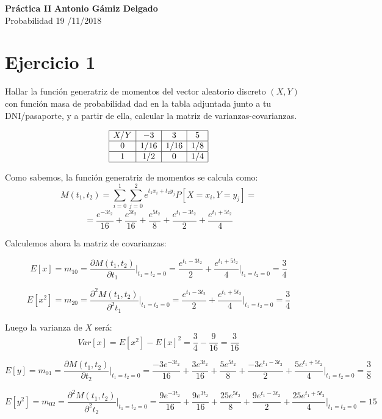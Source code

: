 \documentclass[a4paper, 11pt]{article}
\begin{document}
\noindent
\large\textbf{Práctica II} \hfill \textbf{Antonio Gámiz Delgado} \\
\normalsize Probabilidad \hfill 19 /11/2018

\section*{Ejercicio 1}

Hallar la función generatriz de momentos del vector aleatorio discreto $(X,Y)$ con función masa de probabilidad dad en la tabla adjuntada junto a tu DNI/pasaporte, y a partir de ella, calcular la matriz de varianzas-covarianzas.   

\[
\begin{array}{|c|c|c|c|}
\hline
X/Y & -3 & 3 & 5 \\
\hline
0&1/16&1/16&1/8\\
\hline
1&1/2&0&1/4 \\
\hline
\end{array}
\]

Como sabemos, la función generatriz de momentos se calcula como:
\[
M(t_1,t_2) = \sum_{i=0}^1\sum_{j=0}^2e^{t_1x_i+t_2y_j}P[X=x_i, Y=y_j] = 
\]
\[
= \frac{e^{-3t_2}}{16} + \frac{e^{3t_2}}{16} + \frac{e^{5t_2}}{8} + \frac{e^{t_1-3t_2}}{2} + \frac{e^{t_1+5t_2}}{4}
\]

Calculemos ahora la matriz de covarianzas:

\[
E[x] = m_{10} = \frac{\partial M(t_1, t_2)}{\partial t_1}\Big|_{t_1=t_2=0}=\frac{e^{t_1-3t_2}}{2} + \frac{e^{t_1+5t_2}}{4} \Big|_{t_1=t_2=0} = \frac{3}{4}
\]

\[
E[x^2] = m_{20} = \frac{\partial^2 M(t_1, t_2)}{\partial^2 t_1}\Big|_{t_1=t_2=0}=\frac{e^{t_1-3t_2}}{2} + \frac{e^{t_1+5t_2}}{4} \Big|_{t_1=t_2=0} = \frac{3}{4}
\]

Luego la varianza de $X$ será: 
\[
Var[x] = E[x^2]-E[x]^2=\frac{3}{4}-\frac{9}{16}=\frac{3}{16}
\]

\[
E[y] = m_{01} = \frac{\partial M(t_1, t_2)}{\partial t_2}\Big|_{t_1=t_2=0}=\frac{-3e^{-3t_2}}{16} + \frac{3e^{3t_2}}{16} + \frac{5e^{5t_2}}{8} + \frac{-3e^{t_1-3t_2}}{2} + \frac{5e^{t_1+5t_2}}{4} \Big|_{t_1=t_2=0} = \frac{3}{8}
\]

\[
E[y^2] = m_{02} = \frac{\partial^2 M(t_1, t_2)}{\partial^2 t_2}\Big|_{t_1=t_2=0}=\frac{9e^{-3t_2}}{16} + \frac{9e^{3t_2}}{16} + \frac{25e^{5t_2}}{8} + \frac{9e^{t_1-3t_2}}{2} + \frac{25e^{t_1+5t_2}}{4} \Big|_{t_1=t_2=0} = 15
\]
\end{document}
